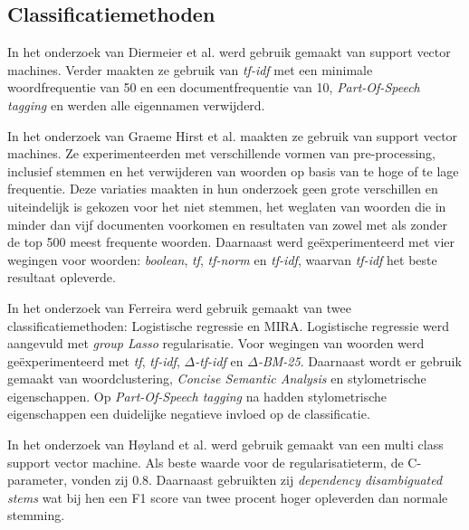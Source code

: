 \subsection{Classificatiemethoden}
\label{sec:Deelvraag1}
In het onderzoek van Diermeier et al. werd gebruik gemaakt van support vector machines. Verder maakten ze gebruik van \textit{tf-idf} met een minimale woordfrequentie van 50 en een documentfrequentie van 10, \textit{Part-Of-Speech tagging} en werden alle eigennamen verwijderd.\par
In het onderzoek van Graeme Hirst et al. maakten ze gebruik van support vector machines\cite{Hirst_textto}. Ze experimenteerden met verschillende vormen van pre-processing, inclusief stemmen en het verwijderen van woorden op basis van te hoge of te lage frequentie. Deze variaties maakten in hun onderzoek geen grote verschillen en uiteindelijk is gekozen voor het niet stemmen, het weglaten van woorden die in minder dan vijf documenten voorkomen en resultaten van zowel met als zonder de top 500 meest frequente woorden. Daarnaast werd geëxperimenteerd met vier wegingen voor woorden: \textit{boolean}, \textit{tf}, \textit{tf-norm} en \textit{tf-idf}, waarvan \textit{tf-idf} het beste resultaat opleverde. \par
In het onderzoek van Ferreira werd gebruik gemaakt van twee classificatiemethoden: Logistische regressie en MIRA\cite{Ferreira2016UsingTT}. Logistische regressie werd aangevuld met \textit{group Lasso} regularisatie. Voor wegingen van woorden werd geëxperimenteerd met \textit{tf}, \textit{tf-idf}, \textit{$\Delta$-tf-idf} en \textit{$\Delta$-BM-25}. Daarnaast wordt er gebruik gemaakt van woordclustering, \textit{Concise Semantic Analysis} en stylometrische eigenschappen. Op \textit{Part-Of-Speech tagging} na hadden stylometrische eigenschappen een duidelijke negatieve invloed op de classificatie.\par
In het onderzoek van Høyland et al. werd gebruik gemaakt van een multi class support vector machine\cite{W14-2516}. Als beste waarde voor de regularisatieterm, de C-parameter, vonden zij 0.8. Daarnaast gebruikten zij \textit{dependency disambiguated
stems} wat bij hen een F1 score van twee procent hoger opleverden dan normale stemming.\par


